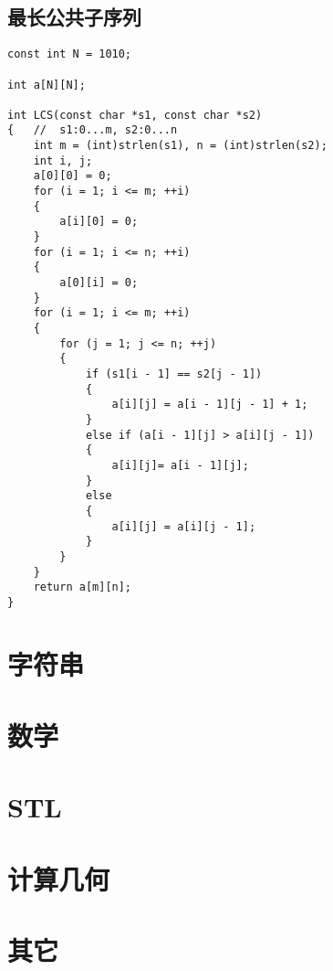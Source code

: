 \subsection{最长公共子序列}
\begin{lstlisting}
const int N = 1010;

int a[N][N];

int LCS(const char *s1, const char *s2)
{   //  s1:0...m, s2:0...n
	int m = (int)strlen(s1), n = (int)strlen(s2);
	int i, j;
	a[0][0] = 0;
	for (i = 1; i <= m; ++i)
	{
		a[i][0] = 0;
	}
	for (i = 1; i <= n; ++i)
	{
		a[0][i] = 0;
	}
	for (i = 1; i <= m; ++i)
	{
		for (j = 1; j <= n; ++j)
		{
			if (s1[i - 1] == s2[j - 1])
			{
				a[i][j] = a[i - 1][j - 1] + 1;
			}
			else if (a[i - 1][j] > a[i][j - 1])
			{
				a[i][j]= a[i - 1][j];
			}
			else
			{
				a[i][j] = a[i][j - 1];
			}
		}
	}
	return a[m][n];
}
\end{lstlisting}








\section{字符串}


\section{数学}


\section{STL}


\section{计算几何}


\section{其它}